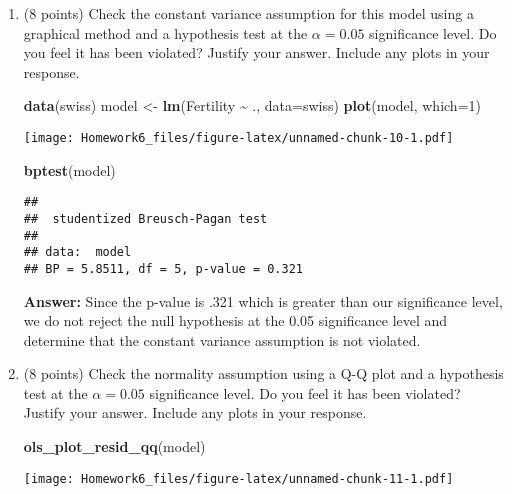 \documentclass[
]{article}
\newenvironment{Shaded}{\begin{snugshade}}{\end{snugshade}}
\newcommand{\AttributeTok}[1]{\textcolor[rgb]{0.13,0.29,0.53}{#1}}
\newcommand{\DecValTok}[1]{\textcolor[rgb]{0.00,0.00,0.81}{#1}}
\newcommand{\FunctionTok}[1]{\textcolor[rgb]{0.13,0.29,0.53}{\textbf{#1}}}
\newcommand{\NormalTok}[1]{#1}
\newcommand{\OtherTok}[1]{\textcolor[rgb]{0.56,0.35,0.01}{#1}}
\newcommand{\SpecialCharTok}[1]{\textcolor[rgb]{0.81,0.36,0.00}{\textbf{#1}}}
\begin{document}
\begin{enumerate}
\def\labelenumi{\arabic{enumi}.}
\item
  (8 points) Check the constant variance assumption for this model using
  a graphical method and a hypothesis test at the \(\alpha = 0.05\)
  significance level. Do you feel it has been violated? Justify your
  answer. Include any plots in your response.

\begin{Shaded}
\begin{Highlighting}[]
\FunctionTok{data}\NormalTok{(swiss)}
\NormalTok{model }\OtherTok{\textless{}{-}} \FunctionTok{lm}\NormalTok{(Fertility }\SpecialCharTok{\textasciitilde{}}\NormalTok{ ., }\AttributeTok{data=}\NormalTok{swiss)}
\FunctionTok{plot}\NormalTok{(model, }\AttributeTok{which=}\DecValTok{1}\NormalTok{)}
\end{Highlighting}
\end{Shaded}

  \texttt{[image: Homework6\_files/figure-latex/unnamed-chunk-10-1.pdf]}

\begin{Shaded}
\begin{Highlighting}[]
\FunctionTok{bptest}\NormalTok{(model)}
\end{Highlighting}
\end{Shaded}

\begin{verbatim}
## 
##  studentized Breusch-Pagan test
## 
## data:  model
## BP = 5.8511, df = 5, p-value = 0.321
\end{verbatim}

  \textbf{Answer:} Since the p-value is .321 which is greater than our
  significance level, we do not reject the null hypothesis at the 0.05
  significance level and determine that the constant variance assumption
  is not violated.
\item
  (8 points) Check the normality assumption using a Q-Q plot and a
  hypothesis test at the \(\alpha = 0.05\) significance level. Do you
  feel it has been violated? Justify your answer. Include any plots in
  your response.

\begin{Shaded}
\begin{Highlighting}[]
\FunctionTok{ols\_plot\_resid\_qq}\NormalTok{(model)}
\end{Highlighting}
\end{Shaded}

  \texttt{[image: Homework6\_files/figure-latex/unnamed-chunk-11-1.pdf]}


\end{enumerate}
\end{document}
